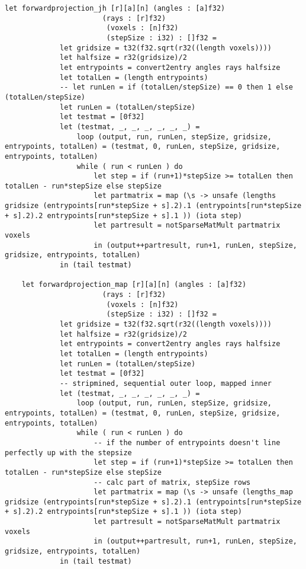 \begin{lstlisting}[language=Futhark]
    let forwardprojection_jh [r][a][n] (angles : [a]f32)
                       (rays : [r]f32)
                        (voxels : [n]f32)
                        (stepSize : i32) : []f32 =
             let gridsize = t32(f32.sqrt(r32((length voxels))))
             let halfsize = r32(gridsize)/2
             let entrypoints = convert2entry angles rays halfsize
             let totalLen = (length entrypoints)
             -- let runLen = if (totalLen/stepSize) == 0 then 1 else (totalLen/stepSize)
             let runLen = (totalLen/stepSize)
             let testmat = [0f32]
             let (testmat, _, _, _, _, _, _) =
                 loop (output, run, runLen, stepSize, gridsize, entrypoints, totalLen) = (testmat, 0, runLen, stepSize, gridsize, entrypoints, totalLen)
                 while ( run < runLen ) do
                     let step = if (run+1)*stepSize >= totalLen then totalLen - run*stepSize else stepSize
                     let partmatrix = map (\s -> unsafe (lengths gridsize (entrypoints[run*stepSize + s].2).1 (entrypoints[run*stepSize + s].2).2 entrypoints[run*stepSize + s].1 )) (iota step)
                     let partresult = notSparseMatMult partmatrix voxels
                     in (output++partresult, run+1, runLen, stepSize, gridsize, entrypoints, totalLen)
             in (tail testmat)

    let forwardprojection_map [r][a][n] (angles : [a]f32)
                       (rays : [r]f32)
                        (voxels : [n]f32)
                        (stepSize : i32) : []f32 =
             let gridsize = t32(f32.sqrt(r32((length voxels))))
             let halfsize = r32(gridsize)/2
             let entrypoints = convert2entry angles rays halfsize
             let totalLen = (length entrypoints)
             let runLen = (totalLen/stepSize)
             let testmat = [0f32]
             -- stripmined, sequential outer loop, mapped inner
             let (testmat, _, _, _, _, _, _) =
                 loop (output, run, runLen, stepSize, gridsize, entrypoints, totalLen) = (testmat, 0, runLen, stepSize, gridsize, entrypoints, totalLen)
                 while ( run < runLen ) do
                     -- if the number of entrypoints doesn't line perfectly up with the stepsize
                     let step = if (run+1)*stepSize >= totalLen then totalLen - run*stepSize else stepSize
                     -- calc part of matrix, stepSize rows
                     let partmatrix = map (\s -> unsafe (lengths_map gridsize (entrypoints[run*stepSize + s].2).1 (entrypoints[run*stepSize + s].2).2 entrypoints[run*stepSize + s].1 )) (iota step)
                     let partresult = notSparseMatMult partmatrix voxels
                     in (output++partresult, run+1, runLen, stepSize, gridsize, entrypoints, totalLen)
             in (tail testmat)


\end{lstlisting}
